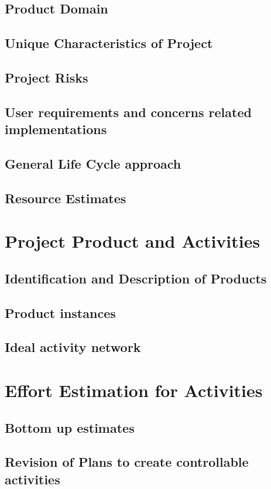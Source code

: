 \documentclass{article}
\begin{document}
		\subsection{Product Domain}
		\subsection{Unique Characteristics of Project}
		\subsection{Project Risks}
		\subsection{User requirements and concerns related implementations}
		\subsection{General Life Cycle approach}
		\subsection{Resource Estimates}
		
	\section{Project Product and Activities}
		\subsection{Identification and Description of Products}
		\subsection{Product instances}
		\subsection{Ideal activity network}
		
	\section{Effort Estimation for Activities}
		\subsection{Bottom up estimates}
		\subsection{Revision of Plans to create controllable activities}
		
\end{document}
